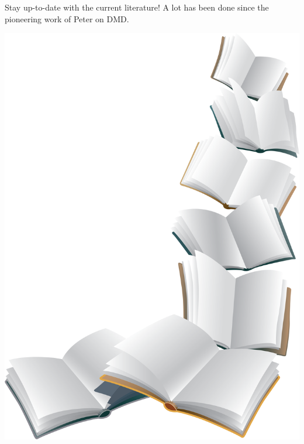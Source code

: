 \documentclass[aspectratio=169, usenames, dvipsnames]{beamer}
\begin{document}
\begin{frame}
  \vfill
  \begin{minipage}{.56\textwidth}
    Stay up-to-date with the current literature! A lot has been done since the pioneering work of Peter on DMD.
  \end{minipage}%
  \hfill
  \begin{minipage}{.40\textwidth}
    \centering
    \includegraphics[width=.9\textwidth]{books}
  \end{minipage}
  \vfill
\end{frame}
\end{document}
